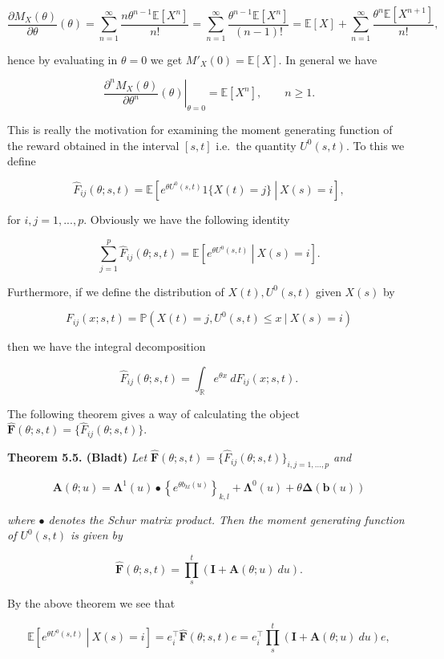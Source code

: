 \documentclass[a4paper,12pt,openany]{book}
\begin{document}
\[
\frac{\partial M_X(\theta)}{\partial \theta}(\theta)=\sum_{n=1}^\infty\frac{n\theta^{n-1} \mathbb E[X^n]}{n!}=\sum_{n=1}^\infty\frac{\theta^{n-1} \mathbb E[X^n]}{(n-1)!}=\mathbb E[X]+\sum_{n=1}^\infty\frac{\theta^{n} \mathbb E[X^{n+1}]}{n!},
\]

hence by evaluating in \(\theta = 0\) we get \(M'_X(0)=\mathbb E[X]\). In general we have

\[
\left.\frac{\partial^n M_X(\theta)}{\partial \theta^n}(\theta)\right\vert_{\theta = 0}=\mathbb E[X^n],\qquad n\ge 1.
\]

This is really the motivation for examining the moment generating function of the reward obtained in the interval \([s,t]\) i.e.~the quantity \(U^0(s,t)\). To this we define

\[
\hat F_{ij}(\theta;s,t)=\mathbb E\left[\left.e^{\theta U^0(s,t)}1\{X(t)=j\}\ \right\vert\ X(s)=i\right],
\]

for \(i,j=1,...,p\). Obviously we have the following identity

\[
\sum_{j=1}^p\hat F_{ij}(\theta;s,t)=\mathbb E\left[\left.e^{\theta U^0(s,t)}\ \right\vert\ X(s)=i\right].
\]

Furthermore, if we define the distribution of \(X(t),U^0(s,t)\) given \(X(s)\) by

\[
F_{ij}(x; s,t)=\mathbb P(X(t)=j,U^0(s,t)\le x\ \vert\ X(s)=i)
\]

then we have the integral decomposition

\[
\hat F_{ij}(\theta; s,t)=\int_{\mathbb R} e^{\theta x}\ dF_{ij}(x; s,t).
\]

The following theorem gives a way of calculating the object \(\hat{\mathbf F}(\theta; s,t)=\{\hat F_{ij}(\theta; s,t)\}\).

\textbf{Theorem 5.5. (Bladt)} \emph{Let \(\hat{\mathbf F}(\theta; s,t)=\{\hat F_{ij}(\theta; s,t)\}_{i,j=1,...,p}\) and}

\[
\mathbf A(\theta;u)=\mathbf\Lambda^1(u)\bullet\left\{e^{\theta b_{kl}(u)}\right\}_{k,l}+\mathbf \Lambda^0(u)+\theta \mathbf \Delta(\mathbf b(u))
\]

\emph{where \(\bullet\) denotes the Schur matrix product. Then the moment generating function of \(U^0(s,t)\) is given by}

\[
\hat{\mathbf F}(\theta; s,t)=\prod_s^t(\mathbf I + \mathbf A(\theta; u)\ du).
\]

By the above theorem we see that

\[
\mathbb E\left[\left.e^{\theta U^0(s,t)}\ \right\vert\ X(s)=i\right] =e_i^\top\hat{\mathbf F}(\theta; s,t)e = e_i^\top\prod_s^t(\mathbf I + \mathbf A(\theta; u)\ du)e,
\]
\end{document}
